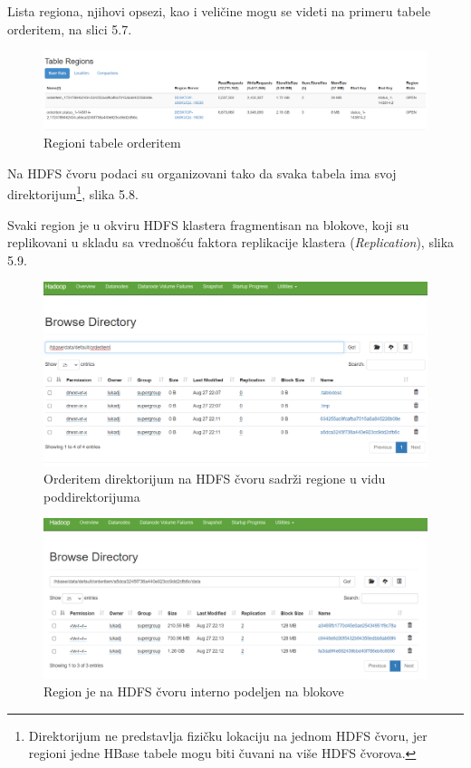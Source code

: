 \documentclass[12pt,oneside]{memoir}
\begin{document}
Lista regiona, njihovi opsezi, kao i veličine mogu se videti na  primeru tabele orderitem, na slici 5.7.

\begin{figure}[!ht]
  \centering
  \includegraphics[width=1\textwidth]{orderitem-regions.png}
  \caption{Regioni tabele orderitem}
  \label{fig:grafikon}
\end{figure}


Na HDFS čvoru podaci su organizovani tako da svaka tabela ima svoj direktorijum\footnote{Direktorijum ne predstavlja fizičku lokaciju na jednom HDFS čvoru, jer regioni jedne HBase tabele mogu biti čuvani na više HDFS čvorova.}, slika 5.8.

Svaki region je u okviru HDFS klastera fragmentisan na blokove, koji su replikovani u skladu sa vrednošću faktora replikacije klastera (\textit{Replication}), slika 5.9.

\begin{figure}[!ht]
  \centering
  \includegraphics[width=1\textwidth]{orderitem-datanode.png}
  \caption{Orderitem direktorijum na HDFS čvoru sadrži regione u vidu poddirektorijuma}
  \label{fig:grafikon}
\end{figure}

\begin{figure}[!ht]
  \centering
  \includegraphics[width=1\textwidth]{orderitem-datanode-regions-blocks.png}
  \caption{Region je na HDFS čvoru interno podeljen na blokove}
  \label{fig:grafikon}
\end{figure}
\end{document}
